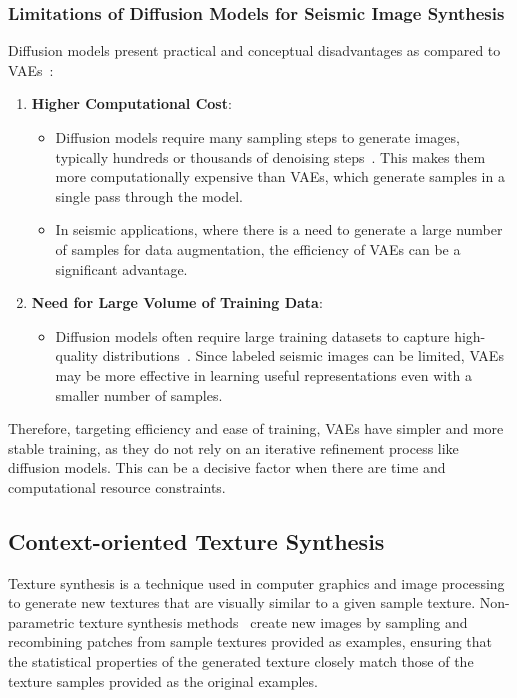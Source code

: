 ﻿\documentclass{ieeeaccess}
\begin{document}
\subsubsection{Limitations of Diffusion Models for Seismic Image Synthesis}
Diffusion models present practical and conceptual disadvantages as compared to VAEs~\cite{Zhou2024}:
\begin{enumerate}
    \item \textbf{Higher Computational Cost}:
    \begin{itemize}
        \item Diffusion models require many sampling steps to generate images, typically hundreds or thousands of denoising steps~\cite{Zhou2024}. This makes them more computationally expensive than VAEs, which generate samples in a single pass through the model.
        \item In seismic applications, where there is a need to generate a large number of samples for data augmentation, the efficiency of VAEs can be a significant advantage. 
    \end{itemize}
    \item \textbf{Need for Large Volume of Training Data}:
    \begin{itemize}
        \item Diffusion models often require large training datasets to capture high-quality distributions~\cite{Zhou2024}. Since labeled seismic images can be limited, VAEs may be more effective in learning useful representations even with a smaller number of samples.
    \end{itemize}
\end{enumerate}

Therefore, targeting efficiency and ease of training, VAEs have simpler and more stable training, as they do not rely on an iterative refinement process like diffusion models. This can be a decisive factor when there are time and computational resource constraints.


\subsection{Context-oriented Texture Synthesis}

Texture synthesis is a technique used in computer graphics and image processing to generate new textures that are visually similar to a given sample texture. Non-parametric texture synthesis methods~\cite{Efros1999} create new images by sampling and recombining patches from sample textures provided as examples, ensuring that the statistical properties of the generated texture closely match those of the texture samples provided as the original  examples.
\end{document}
